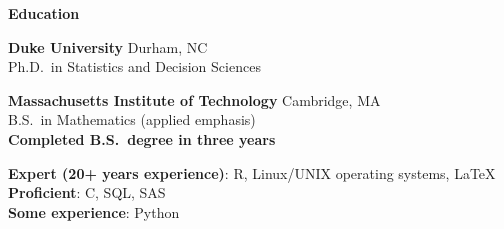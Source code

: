 \documentclass[11pt]{article}
\def\newsectn{\vspace*{0.6cm}}
\def\newitem{\vspace*{0.2cm}}
\begin{document}




\newsectn
{\Large \textbf{Education}}

\textbf{Duke University} \hfill Durham, NC\\
Ph.D.~in Statistics and Decision Sciences %



\newitem
\textbf{Massachusetts Institute of Technology} \hfill Cambridge, MA\\
B.S.~in Mathematics (applied emphasis)\\ %
\textbf{Completed B.S.~degree in three years}



\newsectn
{}

\textbf{Expert (20+ years experience)}: R, Linux/UNIX operating systems, LaTeX\\
\textbf{Proficient}: C, SQL, SAS\\
\textbf{Some experience}: Python

\end{document}
